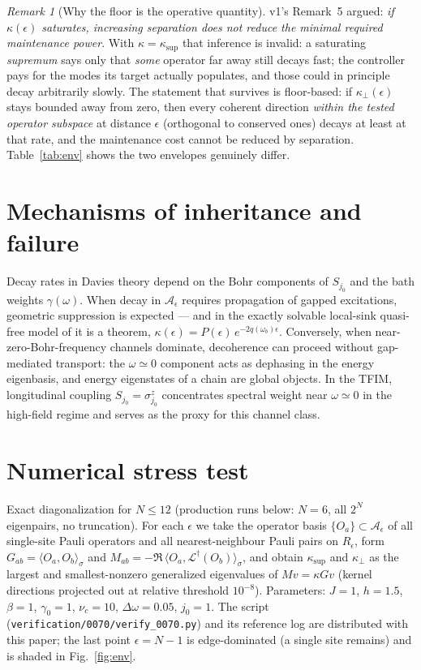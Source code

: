 \documentclass[11pt,a4paper]{article}
\theoremstyle{plain}
\theoremstyle{definition}
\theoremstyle{remark}
\newtheorem{remark}[theorem]{Remark}
\newcommand{\eps}{\epsilon}
\newcommand{\ksup}{\kappa_{\sup}}
\newcommand{\kfl}{\kappa_{\perp}}
\begin{document}
\begin{remark}[Why the floor is the operative quantity]\label{rem:supinf}
v1's Remark~5 argued: \emph{if $\kappa(\eps)$ saturates, increasing separation
does not reduce the minimal required maintenance power}. With $\kappa =
\ksup$ that inference is invalid: a saturating \emph{supremum} says only that
\emph{some} operator far away still decays fast; the controller pays for the
modes its target actually populates, and those could in principle decay
arbitrarily slowly. The statement that survives is floor-based: if
$\kfl(\eps)$ stays bounded away from zero, then every coherent
direction \emph{within the tested operator subspace} at distance $\eps$
(orthogonal to conserved ones) decays at least at that rate, and the maintenance cost cannot be reduced by
separation. Table~\ref{tab:env} shows the two envelopes genuinely differ.
\end{remark}

\section{Mechanisms of inheritance and failure}

Decay rates in Davies theory depend on the Bohr components of $S_{j_0}$ and
the bath weights $\gamma(\omega)$. When decay in $\mathcal{A}_\eps$ requires
propagation of gapped excitations, geometric suppression is expected --- and
in the exactly solvable local-sink quasi-free model of \cite{HCut} it is a
theorem, $\kappa(\eps) = P(\eps)\,e^{-2q(\omega_b)\eps}$. Conversely, when
near-zero-Bohr-frequency channels dominate, decoherence can proceed without
gap-mediated transport: the $\omega \simeq 0$ component acts as dephasing in
the energy eigenbasis, and energy eigenstates of a chain are global objects.
In the TFIM, longitudinal coupling $S_{j_0} = \sigma^z_{j_0}$ concentrates
spectral weight near $\omega \simeq 0$ in the high-field regime and serves as
the proxy for this channel class.

\section{Numerical stress test}

Exact diagonalization for $N \le 12$ (production runs below: $N = 6$, all
$2^N$ eigenpairs, no truncation). For each $\eps$ we take the operator basis
$\{O_a\} \subset \mathcal{A}_\eps$ of all single-site Pauli operators and all
nearest-neighbour Pauli pairs on $R_\eps$, form $G_{ab} = \langle O_a,
O_b\rangle_\sigma$ and $M_{ab} = -\Re\,\langle O_a,
\mathcal{L}^\dagger(O_b)\rangle_\sigma$, and obtain $\ksup$ and $\kfl$ as the
largest and smallest-nonzero generalized eigenvalues of $Mv = \kappa G v$
(kernel directions projected out at relative threshold $10^{-8}$). Parameters:
$J = 1$, $h = 1.5$, $\beta = 1$, $\gamma_0 = 1$, $\nu_c = 10$, $\Delta\omega =
0.05$, $j_0 = 1$. The script (\texttt{verification/0070/verify\_0070.py}) and
its reference log are distributed with this paper; the last point $\eps = N-1$
is edge-dominated (a single site remains) and is shaded in
Fig.~\ref{fig:env}.
\end{document}
